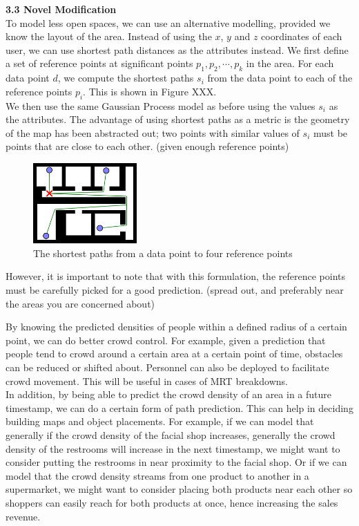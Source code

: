 \documentclass[letterpaper]{article}
\begin{document}
{\bf3.3  Novel Modification} \\

To model less open spaces, we can use an alternative modelling, provided we know the layout of the area. Instead of using the $x$, $y$ and $z$ coordinates of each user, we can use shortest path distances as the attributes instead. We first define a set of reference points at significant points $p_1,p_2,\cdots,p_k$ in the area. For each data point $d$, we compute the shortest paths $s_i$ from the data point to each of the reference points $p_i$. This is shown in Figure XXX. \\

We then use the same Gaussian Process model as before using the values $s_i$ as the attributes. The advantage of using shortest paths as a metric is the geometry of the map has been abstracted out; two points with similar values of $s_i$ must be points that are close to each other. (given enough reference points)\\

\begin{figure}[h!]
  \centering
    \includegraphics[width=150px,natwidth=570,natheight=442]{shortestpaths.png}
  \caption{The shortest paths from a data point to four reference points}
\end{figure}

However, it is important to note that with this formulation, the reference points must be carefully picked for a good prediction. (spread out, and preferably near the areas you are concerned about)

By knowing the predicted densities of people within a defined radius of a certain point, we can do better crowd control. For example, given a prediction that people tend to crowd around a certain area at a certain point of time, obstacles can be reduced or shifted about. Personnel can also be deployed to facilitate crowd movement. This will be useful in cases of MRT breakdowns. \\

In addition, by being able to predict the crowd density of an area in a future timestamp, we can do a certain form of path prediction. This can help in deciding building maps and object placements. For example, if we can model that generally if the crowd density of the facial shop increases, generally the crowd density of the restrooms will increase in the next timestamp, we might want to consider putting the restrooms in near proximity to the facial shop. Or if we can model that the crowd density streams from one product to another in a supermarket, we might want to consider placing both products near each other so shoppers can easily reach for both products at once, hence increasing the sales revenue.  \\
\end{document}

